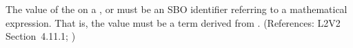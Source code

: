 The value of the   on a \AlgebraicRule, \RateRule or
\AssignmentRule must be an SBO identifier referring to a mathematical
expression.  That is, the value must be a term derived from
\sbomathformula.  (References: L2V2 Section~4.11.1;
)
